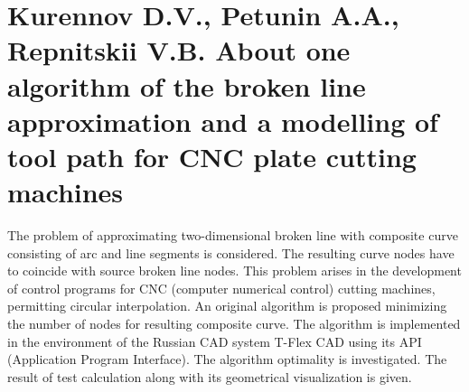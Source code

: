 \section*{Kurennov D.V., Petunin A.A., Repnitskii V.B.
About one algorithm of the broken line approximation and a modelling of tool path
for CNC plate cutting machines}

The problem of approximating two-dimensional broken line
with composite curve consisting of arc and line segments
is considered.
The resulting curve nodes have to coincide with source broken line nodes.
This problem arises in the development of control programs
for CNC (computer numerical control) cutting machines,
permitting circular interpolation.
An original algorithm is proposed
minimizing the number of nodes for resulting composite curve.
The algorithm is implemented in the environment of the Russian CAD system 
T-Flex CAD using its API (Application Program Interface).
The algorithm optimality is investigated.
The result of test calculation along with its geometrical visualization is given.

